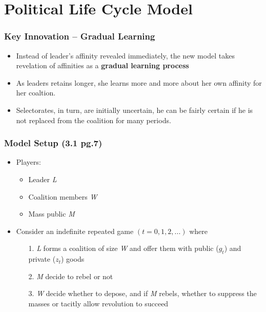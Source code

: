 \documentclass[10pt,handout]{beamer}
\begin{document}
\section{Political Life Cycle Model}
\begin{frame}
\frametitle{Key Innovation -- Gradual Learning}
\begin{itemize}
    \item Instead of leader's affinity revealed immediately, the new model takes revelation of affinities as a \textbf{gradual learning process}
    \item As leaders retains longer, she learns more and more about her own affinity for her coaltion.
    \item Selectorates, in turn, are initially uncertain, he can be fairly certain if he is not replaced from the coalition for many periods. 
\end{itemize}
\end{frame}

\begin{frame}
\frametitle{Model Setup (3.1 pg.7)}
\begin{itemize}
    \item Players:
    \begin{itemize}
        \item Leader \textit{L}
        \item Coalition members \textit{W}
        \item Mass public \textit{M}
    \end{itemize}
    \item Consider an indefinite repeated game $(t = 0, 1, 2, ...)$ where
    \begin{itemize}
        \item[1.] \textit{L} forms a coalition of size \textit{W} and offer them with public ($g_t$) and private ($z_t$) goods
        \item[2.] \textit{M} decide to rebel or not
        \item[3.] \textit{W} decide whether to depose, and if \textit{M} rebels, whether to suppress the masses or tacitly allow revolution to succeed
    \end{itemize}
\end{itemize}
\end{frame}
\end{document}
